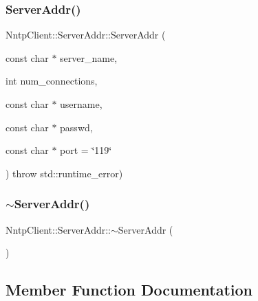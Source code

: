 \hypertarget{class_nntp_client_1_1_server_addr_a9a237edb548ad3e03d105346edb261a5}{}\label{class_nntp_client_1_1_server_addr_a9a237edb548ad3e03d105346edb261a5} 
\subsubsection{\texorpdfstring{Server\+Addr()}{ServerAddr()}\hspace{0.1cm}{\footnotesize\ttfamily [6/6]}}
{\footnotesize\ttfamily Nntp\+Client\+::\+Server\+Addr\+::\+Server\+Addr (\begin{DoxyParamCaption}\item[{const char $\ast$}]{server\+\_\+name,  }\item[{int}]{num\+\_\+connections,  }\item[{const char $\ast$}]{username,  }\item[{const char $\ast$}]{passwd,  }\item[{const char $\ast$}]{port = {\ttfamily \char`\"{}119\char`\"{}} }\end{DoxyParamCaption}) throw  std\+::runtime\+\_\+error) }

\hypertarget{class_nntp_client_1_1_server_addr_ac5497a8edd97dce1d5c6a558e061d533}{}\label{class_nntp_client_1_1_server_addr_ac5497a8edd97dce1d5c6a558e061d533} 
\subsubsection{\texorpdfstring{$\sim$\+Server\+Addr()}{~ServerAddr()}}
{\footnotesize\ttfamily Nntp\+Client\+::\+Server\+Addr\+::$\sim$\+Server\+Addr (\begin{DoxyParamCaption}{ }\end{DoxyParamCaption})\hspace{0.3cm}{\ttfamily [inline]}}



\subsection{Member Function Documentation}
\hypertarget{class_nntp_client_1_1_server_addr_a8b7878a4680012c1cd9ce8363c98ade7}{}\label{class_nntp_client_1_1_server_addr_a8b7878a4680012c1cd9ce8363c98ade7} 
